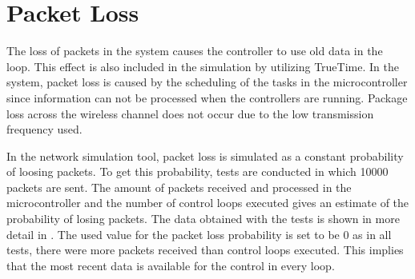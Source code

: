 \section{Packet Loss}
The loss of packets in the system causes the controller to use old data in the loop. This effect is also included in the simulation by utilizing TrueTime. In the system, packet loss is caused by the scheduling of the tasks in the microcontroller since information can not be processed when the controllers are running. Package loss across the wireless channel does not occur due to the low transmission frequency used. 

In the network simulation tool, packet loss is simulated as a constant probability of loosing packets. To get this probability, tests are conducted in which 10000 packets are sent. The amount of packets received and processed in the microcontroller and the number of control loops executed gives an estimate of the probability of losing packets. The data obtained with the tests is shown in more detail in . The used value for the packet loss probability is set to be 0 as in all tests, there were more packets received than control loops executed. This implies that the most recent data is available for the control in every loop. 